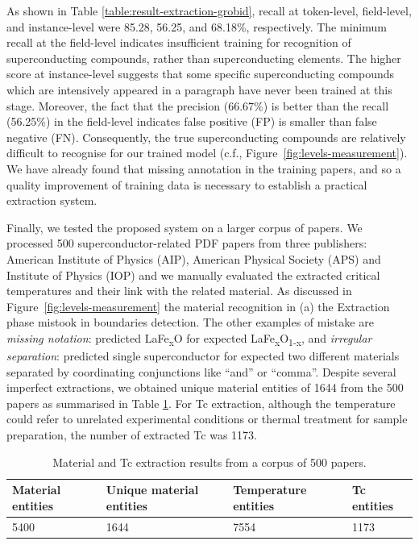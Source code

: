 \documentclass{article}[a4]
\begin{document}
As shown in Table \ref{table:result-extraction-grobid}, recall at token-level, field-level, and instance-level were 85.28, 56.25, and 68.18\%, respectively. The minimum recall at the field-level indicates insufficient training for recognition of superconducting compounds, rather than superconducting elements. The higher score at instance-level suggests that some specific superconducting compounds which are intensively appeared in a paragraph have never been trained at this stage. Moreover, the fact that the precision (66.67\%) is better than the recall (56.25\%) in the field-level indicates false positive (FP) is smaller than false negative (FN). Consequently, the true superconducting compounds are relatively difficult to recognise for our trained model (c.f., Figure~\ref{fig:levels-measurement}). We have already found that missing annotation in the training papers, and so a quality improvement of training data is necessary to establish a practical extraction system.

Finally, we tested the proposed system on a larger corpus of papers. We processed 500 superconductor-related PDF papers from three publishers: American Institute of Physics (AIP), American Physical Society (APS) and Institute of Physics (IOP) and we manually evaluated the extracted critical temperatures and their link with the related material. As discussed in Figure~\ref{fig:levels-measurement} the material recognition in (a) the Extraction phase mistook in boundaries detection. The other examples of mistake are \textit{missing notation}: predicted LaFe\textsubscript{x}O for expected LaFe\textsubscript{x}O\textsubscript{1-x}, and \textit{irregular separation}: predicted single superconductor for expected two different materials separated by coordinating conjunctions like “and” or “comma”.
Despite several imperfect extractions, we obtained unique material entities of 1644 from the 500 papers as summarised in Table \ref{table:result-extraction}. For Tc extraction, although the temperature could refer to unrelated experimental conditions or thermal treatment for sample preparation, the number of extracted Tc was 1173.

\begin{table}[h!]
    \centering
    \caption{Material and Tc extraction results from a corpus of 500 papers.}    
    \begin{tabular}{ | m{4em} | m{4em} | m{6em} | m{5em} | } 
    \hline
        Material entities & Unique material entities & Temperature entities & Tc entities \\
    \hline
        5400 & 1644 & 7554 & 1173 \\ 
    \hline
    \end{tabular}
    \label{table:result-extraction}
\end{table}
\end{document}
